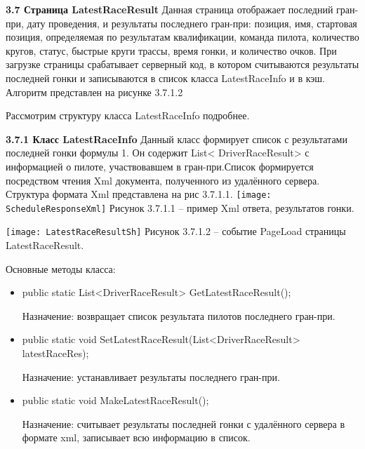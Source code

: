 \documentclass[14pt,a4paper]{extreport}
\begin{document}
	\flushleft\hspace{4ex}\textbf{3.7 Страница LatestRaceResult}
\flushleft\hspace{4ex}Данная страница отображает последний гран-при, дату проведения, и результаты последнего гран-при: позиция, имя, стартовая позиция, определяемая по результатам квалификации, команда пилота, количество кругов, статус, быстрые круги трассы, время гонки, и количество очков. При загрузке страницы срабатывает серверный код, в котором считываются результаты последней гонки и записываются в список класса LatestRaceInfo и в кэш. Алгоритм представлен на рисунке 3.7.1.2\par
\hspace{4ex}Рассмотрим структуру класса LatestRaceInfo подробнее.\par
	\flushleft{}
	\flushleft\hspace{4ex}\textbf{3.7.1 Класс LatestRaceInfo}
	\flushleft\hspace{4ex}Данный класс формирует список с результатами последней гонки формулы 1. Он содержит List< DriverRaceResult>  с информацией о пилоте, участвовавшем в гран-при.Список формируется посредством чтения  Xml документа, полученного из удалённого сервера. Структура формата Xml представлена на рис 3.7.1.1.
	\texttt{[image: ScheduleResponseXml]}   
           \center Рисунок 3.7.1.1 – пример Xml ответа, результатов гонки.\par
           \texttt{[image: LatestRaceResultSh]}   
           \center Рисунок 3.7.1.2 – событие PageLoad страницы LatestRaceResult.\par
           \flushleft\hspace{4ex}Основные методы класса:\par
\begin{itemize}
\item public static List<DriverRaceResult> GetLatestRaceResult();\par
Назначение: возвращает список результата пилотов последнего гран-при.\par
\item public static void SetLatestRaceResult(List<DriverRaceResult> latestRaceRes);\par
Назначение: устанавливает результаты последнего гран-при.\par
\item public static void MakeLatestRaceResult();\par
Назначение: считывает результаты последней гонки с удалённого сервера в формате xml, записывает всю информацию в список.\par
\end{itemize}
           
\end{document}
